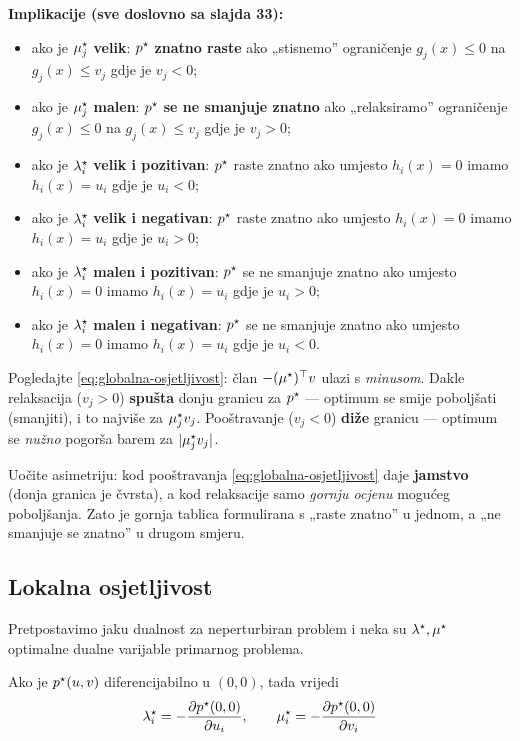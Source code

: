 \textbf{Implikacije (sve doslovno sa slajda 33):}

\begin{itemize}
  \item ako je $\mu_j^{\star}$ \textbf{velik}: $p^{\star}$ \textbf{znatno raste} ako
        „stisnemo” ograničenje $g_j(x)\le0$ na $g_j(x)\le v_j$ gdje je
        $v_j < 0$;
  \item ako je $\mu_j^{\star}$ \textbf{malen}: $p^{\star}$ \textbf{se ne smanjuje
        znatno} ako „relaksiramo” ograničenje $g_j(x)\le0$ na $g_j(x)\le v_j$
        gdje je $v_j > 0$;
  \item ako je $\lambda_i^{\star}$ \textbf{velik i pozitivan}: $p^{\star}$ raste znatno
        ako umjesto $h_i(x)=0$ imamo $h_i(x)=u_i$ gdje je $u_i < 0$;
  \item ako je $\lambda_i^{\star}$ \textbf{velik i negativan}: $p^{\star}$ raste znatno
        ako umjesto $h_i(x)=0$ imamo $h_i(x)=u_i$ gdje je $u_i > 0$;
  \item ako je $\lambda_i^{\star}$ \textbf{malen i pozitivan}: $p^{\star}$ se ne
        smanjuje znatno ako umjesto $h_i(x)=0$ imamo $h_i(x)=u_i$ gdje je
        $u_i > 0$;
  \item ako je $\lambda_i^{\star}$ \textbf{malen i negativan}: $p^{\star}$ se ne
        smanjuje znatno ako umjesto $h_i(x)=0$ imamo $h_i(x)=u_i$ gdje je
        $u_i < 0$.
\end{itemize}

\begin{napomena}
Pogledajte \eqref{eq:globalna-osjetljivost}: član $-(\mu^{\star})^{\top} v$ ulazi s
\emph{minusom}. Dakle relaksacija ($v_j > 0$) \textbf{spušta} donju granicu za
$p^{\star}$ --- optimum se smije poboljšati (smanjiti), i to najviše za
$\mu_j^{\star} v_j$. Pooštravanje ($v_j < 0$) \textbf{diže} granicu --- optimum se
\emph{nužno} pogorša barem za $|\mu_j^{\star} v_j|$.

Uočite asimetriju: kod pooštravanja \eqref{eq:globalna-osjetljivost} daje
\textbf{jamstvo} (donja granica je čvrsta), a kod relaksacije samo
\emph{gornju ocjenu} mogućeg poboljšanja. Zato je gornja tablica formulirana s
„raste znatno” u jednom, a „ne smanjuje se znatno” u drugom smjeru.
\end{napomena}

\subsection{Lokalna osjetljivost}

\begin{teorem}
Pretpostavimo jaku dualnost za neperturbiran problem i neka su
$\lambda^{\star}, \mu^{\star}$ optimalne dualne varijable primarnog problema.

Ako je $p^{\star}(u,v)$ diferencijabilno u $(0,0)$, tada vrijedi
\begin{equation}
\label{eq:lokalna-osjetljivost}
\lambda_i^{\star} = -\frac{\partial p^{\star}(0,0)}{\partial u_i}, \qquad
\mu_i^{\star} = -\frac{\partial p^{\star}(0,0)}{\partial v_i}
\end{equation}
\end{teorem}

